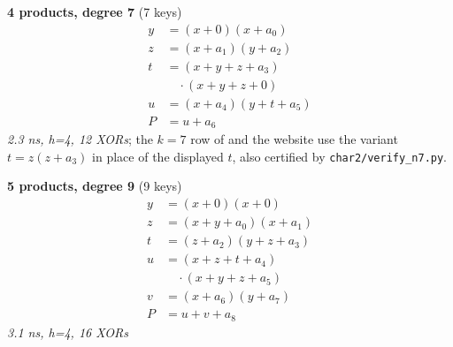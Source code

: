 \medskip
\noindent
\begin{minipage}[t]{0.47\textwidth}
\textbf{4 products, degree 7} (7 keys)
\[
\begin{aligned}
y &= (x + 0)(x + a_0) \\
z &= (x + a_1)(y + a_2) \\
t &= (x + y + z + a_3) \\
  &\quad\cdot(x + y + z + 0) \\
u &= (x + a_4)(y + t + a_5) \\
P &= u + a_6
\end{aligned}
\]
\emph{2.3 ns, h=4, 12 XORs}; the $k=7$ row of
 and the website use the variant
$t=z(z+a_3)$ in place of the displayed $t$, also certified by
\texttt{char2/verify\_n7.py}.
\end{minipage}
\hfill
\begin{minipage}[t]{0.47\textwidth}
\textbf{5 products, degree 9} (9 keys)
\[
\begin{aligned}
y &= (x + 0)(x + 0) \\
z &= (x + y + a_0)(x + a_1) \\
t &= (z + a_2)(y + z + a_3) \\
u &= (x + z + t + a_4) \\
  &\quad\cdot(x + y + z + a_5) \\
v &= (x + a_6)(y + a_7) \\
P &= u + v + a_8
\end{aligned}
\]
\emph{3.1 ns, h=4, 16 XORs}
\end{minipage}

